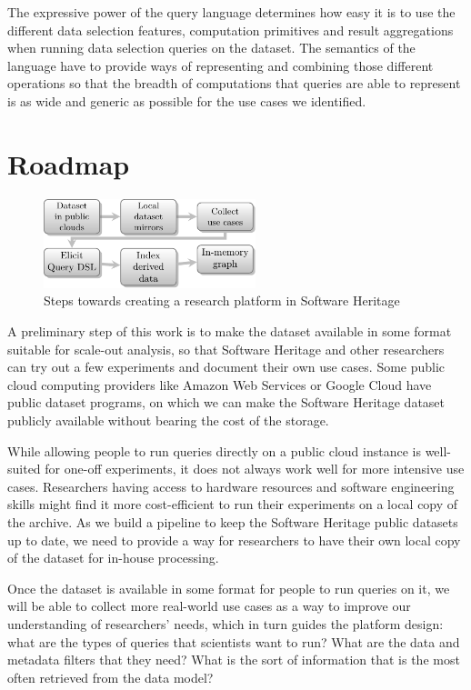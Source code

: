 The expressive power of the query language determines how easy it is to use the
different data selection features, computation primitives and result
aggregations when running data selection queries on the dataset. The semantics
of the language have to provide ways of representing and combining those
different operations so that the breadth of computations that queries are able
to represent is as wide and generic as possible for the use cases we
identified.

\section{Roadmap}

\begin{figure}
\begin{center}
    \includegraphics[width=0.55\textwidth]{../img/roadmap}
\end{center}
\caption{Steps towards creating a research platform in Software Heritage}%
\label{fig:roadmap}
\end{figure}

A preliminary step of this work is to make the dataset available in some
format suitable for scale-out analysis, so that Software Heritage and other
researchers can try out a few experiments and document their own use cases.
Some public cloud computing providers like Amazon Web Services or Google Cloud
have public dataset programs, on which we can make the Software Heritage
dataset publicly available without bearing the cost of the storage.

While allowing people to run queries directly on a public cloud instance is
well-suited for one-off experiments, it does not always work well for more intensive
use cases. Researchers having access to hardware resources and software engineering
skills might find it more cost-efficient to run their experiments on a local
copy of the archive. As we build a pipeline to keep the Software Heritage
public datasets up to date, we need to provide a way for researchers to have
their own local copy of the dataset for in-house processing.

Once the dataset is available in some format for people to run queries on it,
we will be able to collect more real-world use cases as a way to improve our
understanding of researchers' needs, which in turn guides the platform design:
what are the types of queries that scientists want to run? What are the data
and metadata filters that they need?  What is the sort of information that is
the most often retrieved from the data model?

